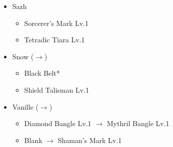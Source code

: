 \begin{menu}
\begin{itemize}
\begin{itemize}
		\end{itemize}
		\equip
		\begin{itemize}
			\item Sazh
				\begin{itemize}
					\item Sorcerer's Mark Lv.1
					\item Tetradic Tiara Lv.1
				\end{itemize}
			\item Snow ($\rightarrow$)
				\begin{itemize}
					\item Black Belt*
					\item Shield Talisman Lv.1
				\end{itemize}
			\item Vanille ($\rightarrow$)
				\begin{itemize}
					\item Diamond Bangle Lv.1 $\rightarrow$ Mythril Bangle Lv.1
					\item Blank $\rightarrow$ Shaman's Mark Lv.1
				\end{itemize}
		\end{itemize}
	\end{itemize}
\end{menu}